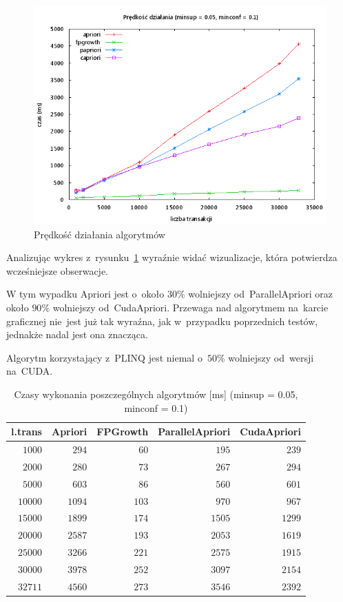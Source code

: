 \begin{figure}[H]
\centering
\includegraphics[width=1.1\textwidth]{figures/06/005_01.png}
\caption{Prędkość działania algorytmów\label{rys:005_01}}
\end{figure}

Analizując wykres z~rysunku~\ref{rys:005_01} wyraźnie widać wizualizacje, która potwierdza wcześniejsze obserwacje.

W tym wypadku Apriori jest o~około $30\%$ wolniejszy od~ParallelApriori oraz około $90\%$ wolniejszy od~CudaApriori. Przewaga nad algorytmem na~karcie graficznej nie~jest już tak wyraźna, jak w~przypadku poprzednich testów, jednakże nadal jest ona znacząca. 

Algorytm korzystający z~PLINQ jest niemal o~$50\%$ wolniejszy od~wersji na~CUDA.

\begin{table}
	\centering
	\begin{tabular}{r|r|r|r|r}
	\textbf{l.trans} & \textbf{Apriori} & \textbf{FPGrowth} & \textbf{ParallelApriori} & \textbf{CudaApriori}  \\ \hline
	$1000$ & $294$ & $60$ & $195$ & $239$ \\
	$2000$ & $280$ & $73$ & $267$ & $294$ \\
	$5000$ & $603$ & $86$ & $560$ & $601$ \\
	$10000$ & $1094$ & $103$ & $970$ & $967$ \\
	$15000$ & $1899$ & $174$ & $1505$ & $1299$ \\
	$20000$ & $2587$ & $193$ & $2053$ & $1619$ \\
	$25000$ & $3266$ & $221$ & $2575$ & $1915$ \\
	$30000$ & $3978$ & $252$ & $3097$ & $2154$ \\
	$32711$ & $4560$ & $273$ & $3546$ & $2392$ \\
	\end{tabular}
	\caption{Czasy wykonania poszczególnych algorytmów [ms] (minsup = 0.05, minconf = 0.1)\label{tab:005_01}}
\end{table}


